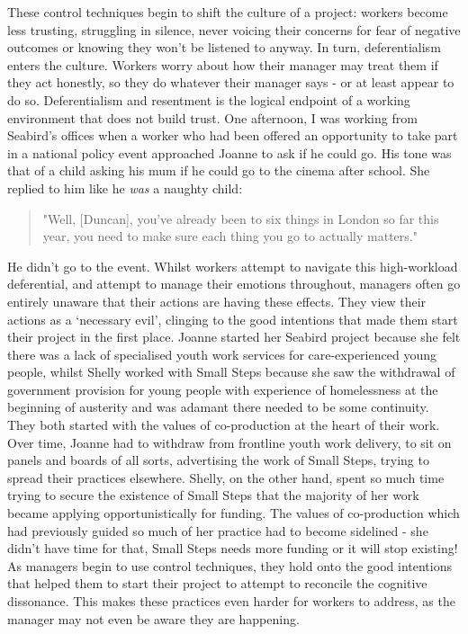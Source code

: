These control techniques begin to shift the culture of a project: workers become less trusting, struggling in silence, never voicing their concerns for fear of negative outcomes or knowing they won’t be listened to anyway. In turn, deferentialism enters the culture. Workers worry about how their manager may treat them if they act honestly, so they do whatever their manager says - or at least appear to do so. Deferentialism and resentment is the logical endpoint of a working environment that does not build trust. One afternoon, I was working from Seabird’s offices when a worker who had been offered an opportunity to take part in a national policy event approached Joanne to ask if he could go. His tone was that of a child asking his mum if he could go to the cinema after school. She replied to him like he \textit{was} a naughty child:
\begin{quote}
"Well, [Duncan], you've already been to six things in London so far this year, you need to make sure each thing you go to actually matters."
\end{quote}
He didn’t go to the event. Whilst workers attempt to navigate this high-workload deferential, and attempt to manage their emotions throughout, managers often go entirely unaware that their actions are having these effects. They view their actions as a ‘necessary evil’, clinging to the good intentions that made them start their project in the first place. 
Joanne started her Seabird project because she felt there was a lack of specialised youth work services for care-experienced young people, whilst Shelly worked with Small Steps because she saw the withdrawal of government provision for young people with experience of homelessness at the beginning of austerity and was adamant there needed to be some continuity. They both started with the values of co-production at the heart of their work. Over time, Joanne had to withdraw from frontline youth work delivery, to sit on panels and boards of all sorts, advertising the work of Small Steps, trying to spread their practices elsewhere. Shelly, on the other hand, spent so much time trying to secure the existence of Small Steps that the majority of her work became applying opportunistically for funding. The values of co-production which had previously guided so much of her practice had to become sidelined - she didn't have time for that, Small Steps needs more funding or it will stop existing! As managers begin to use control techniques, they hold onto the good intentions that helped them to start their project to attempt to reconcile the cognitive dissonance. This makes these practices even harder for workers to address, as the manager may not even be aware they are happening. 


